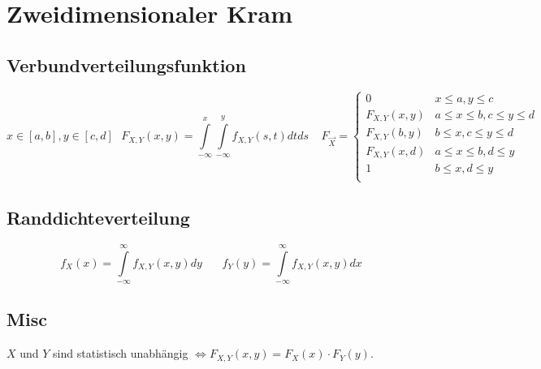 \documentclass[10pt,a4paper]{article}
\begin{document}
\section{Zweidimensionaler Kram}
\subsection{Verbundverteilungsfunktion}
\[x \in \left[a,b\right], y \in \left[c,d\right]\ \ \ 
F_{X,Y}(x,y) = \int\limits_{-\infty}^x
\int\limits_{-\infty}^y f_{X,Y}(s,t) dt ds \ \ \ \ \ F_{\vec{X}} =
\begin{cases}
0 & x \leq a, y\leq c \\
F_{X,Y}(x,y) & a \leq x \leq b, c\leq y\leq d \\
F_{X,Y}(b,y) & b \leq x, c\leq y\leq d \\
F_{X,Y}(x,d) & a \leq x \leq b, d\leq y \\
1 & b \leq x, d\leq y \\
\end{cases}
\]
\subsection{Randdichteverteilung}
\[f_X(x) = \int\limits_{-\infty}^\infty f_{X,Y}(x,y) dy\ \ \ \ \ \ \ \ f_Y(y) = \int\limits_{-\infty}^\infty f_{X,Y}(x,y) dx\]

\subsection{Misc}
$X$ und $Y$ sind statistisch unabhängig $ \Leftrightarrow F_{X,Y}(x,y) = F_X(x)\cdot F_Y(y)$.
\end{document}
